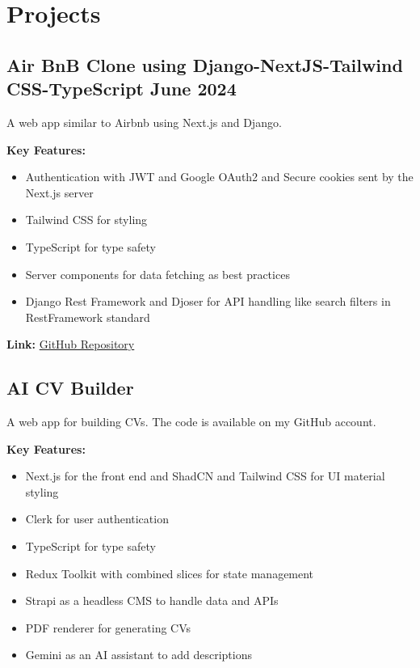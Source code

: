 \documentclass[a4paper,11pt]{article}
\begin{document}
\vspace{10pt}

\section*{Projects}

\subsection*{Air BnB Clone using Django-NextJS-Tailwind CSS-TypeScript \hfill \normalsize June 2024}
A web app similar to Airbnb using Next.js and Django.

\textbf{Key Features:}
\begin{itemize}[leftmargin=*, itemsep=2pt]
  \item Authentication with JWT and Google OAuth2 and Secure cookies sent by the Next.js server
  \item Tailwind CSS for styling
  \item TypeScript for type safety
  \item Server components for data fetching as best practices
  \item Django Rest Framework and Djoser for API handling like search filters in RestFramework standard
\end{itemize}

\textbf{Link:} \href{https://github.com/RezaAstaraki/air-bnb-clone}{GitHub Repository}

\vspace{8pt}

\subsection*{AI CV Builder}
A web app for building CVs. The code is available on my GitHub account.

\textbf{Key Features:}
\begin{itemize}[leftmargin=*, itemsep=2pt]
  \item Next.js for the front end and ShadCN and Tailwind CSS for UI material styling
  \item Clerk for user authentication
  \item TypeScript for type safety
  \item Redux Toolkit with combined slices for state management
  \item Strapi as a headless CMS to handle data and APIs
  \item PDF renderer for generating CVs
  \item Gemini as an AI assistant to add descriptions
\end{itemize}
\end{document}
